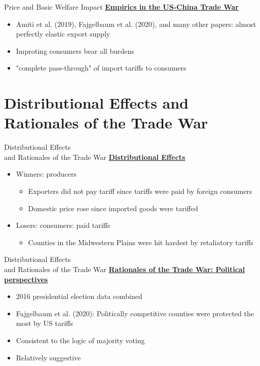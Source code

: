 \documentclass{beamer}
\begin{document}
\begin{frame}{Price and Basic Welfare Impact}
    \underline{\textbf{Empirics in the US-China Trade War}}
    \begin{itemize}
        \item Amiti et al. (2019), Fajgelbaum et al. (2020), and many other papers: 
        almost {\color{red}perfectly elastic} export supply
        \item Improting consumers bear all burdens 
        \item {\color{red}"complete pass-through"} of import tariffs to consumers
    \end{itemize}
\end{frame}

\section{Distributional Effects and Rationales of the Trade War}
\begin{frame}{Distributional Effects \\ and Rationales of the Trade War}
\underline{\textbf{Distributional Effects}}
\begin{itemize}
    \item Winners: producers
    \begin{itemize}
        \item Exporters did {\color{red}not} pay tariff since tariffs were paid by foreign consumers
        \item {\color{red}Domestic price rose} since imported goods were tariffed
    \end{itemize}
    \item Losers: consumers: paid tariffs
    \begin{itemize}
        \item Counties in the Midwestern Plains were hit hardest by retaliatory tariffs
    \end{itemize}
\end{itemize}
\end{frame}

\begin{frame}{Distributional Effects \\ and Rationales of the Trade War}
\underline{\textbf{Rationales of the Trade War: {\color{red}Political} perspectives}}
\begin{itemize}
    \item 2016 presidential election data combined
    \item Fajgelbaum et al. (2020): {\color{red}Politically competitive} counties were protected the most by US tariffs
    \item Consistent to the logic of {\color{red}majority voting}
    \item Relatively suggestive
\end{itemize}
\end{frame}
\end{document}
